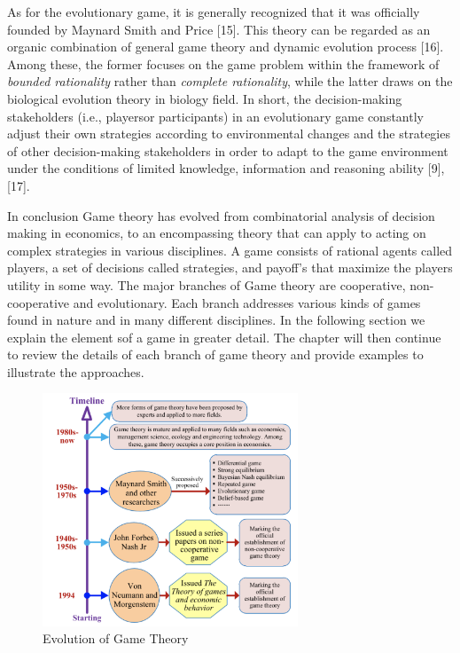 As for the evolutionary game, it is generally recognized that it was 
officially founded by Maynard Smith and Price [15]. This theory can be 
regarded as an organic combination of general game theory and dynamic 
evolution process [16]. Among these, the former focuses on the game 
problem within the framework of \textit{bounded rationality} rather than 
\textit{complete rationality}, while the latter draws on the biological 
evolution theory in biology field. In short, the decision-making 
stakeholders (i.e., playersor participants) in an evolutionary game 
constantly adjust their own strategies according to environmental 
changes and the strategies of other decision-making stakeholders in 
order to adapt to the game environment under the conditions of limited 
knowledge, information and reasoning ability [9], [17].

In conclusion Game theory has evolved from combinatorial analysis of 
decision making in economics, to an encompassing theory that can apply
to acting on complex strategies in various disciplines. A game consists
of rational agents called players, a set of decisions called strategies, 
and payoff's that maximize the players utility in some way. The major 
branches of Game theory are cooperative, non-cooperative and evolutionary.
Each branch addresses various kinds of games found in nature and in 
many different disciplines. In the following section we explain the 
element sof a game in greater detail. The chapter will then continue to 
review the details of each branch of game theory and provide examples to 
illustrate the approaches.


\begin{figure}
    \centering
    \includegraphics[width=3.0in]{Figures/timeline_gt.png}
    \caption{Evolution of Game Theory}
    \label{evolution of gametheory}
\end{figure}

